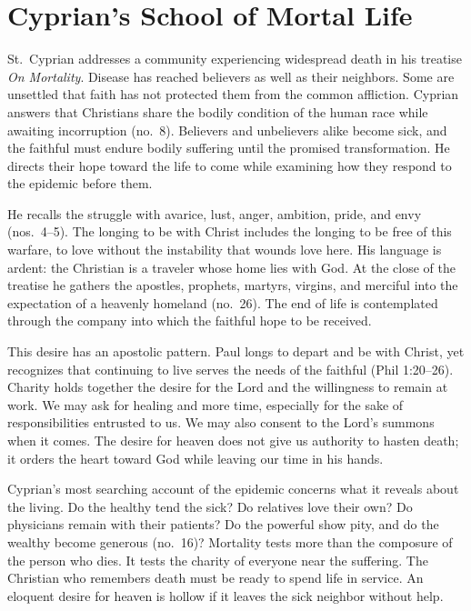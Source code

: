 \section{Cyprian's School of Mortal Life}

St.~Cyprian addresses a community experiencing widespread death in his treatise \emph{On Mortality}. Disease has reached believers as well as their neighbors. Some are unsettled that faith has not protected them from the common affliction. Cyprian answers that Christians share the bodily condition of the human race while awaiting incorruption (no.~8). Believers and unbelievers alike become sick, and the faithful must endure bodily suffering until the promised transformation. He directs their hope toward the life to come while examining how they respond to the epidemic before them.

He recalls the struggle with avarice, lust, anger, ambition, pride, and envy (nos.~4--5). The longing to be with Christ includes the longing to be free of this warfare, to love without the instability that wounds love here. His language is ardent: the Christian is a traveler whose home lies with God. At the close of the treatise he gathers the apostles, prophets, martyrs, virgins, and merciful into the expectation of a heavenly homeland (no.~26). The end of life is contemplated through the company into which the faithful hope to be received.

This desire has an apostolic pattern. Paul longs to depart and be with Christ, yet recognizes that continuing to live serves the needs of the faithful (Phil 1:20--26). Charity holds together the desire for the Lord and the willingness to remain at work. We may ask for healing and more time, especially for the sake of responsibilities entrusted to us. We may also consent to the Lord's summons when it comes. The desire for heaven does not give us authority to hasten death; it orders the heart toward God while leaving our time in his hands.

Cyprian's most searching account of the epidemic concerns what it reveals about the living. Do the healthy tend the sick? Do relatives love their own? Do physicians remain with their patients? Do the powerful show pity, and do the wealthy become generous (no.~16)? Mortality tests more than the composure of the person who dies. It tests the charity of everyone near the suffering. The Christian who remembers death must be ready to spend life in service. An eloquent desire for heaven is hollow if it leaves the sick neighbor without help.


